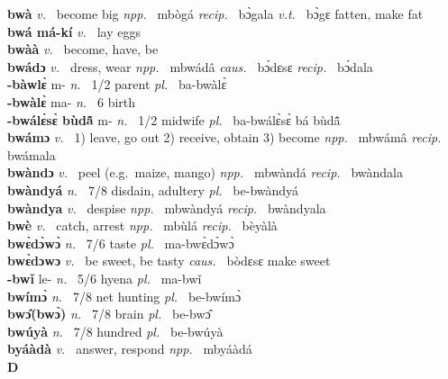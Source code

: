 {\bfseries bwà}  {\itshape v.~} become big   {\itshape npp.~} mbògá {\itshape recip.~} bɔ̀gala {\itshape v.t.~} bɔ̀gɛ fatten, make fat \\ 
{\bfseries bwá má-kí}  {\itshape v.~} lay eggs    \\ 
{\bfseries bwàà}  {\itshape v.~} become, have, be    \\ 
{\bfseries bwádɔ}  {\itshape v.~} dress, wear   {\itshape npp.~} mbwádâ {\itshape caus.~} bɔ́dɛsɛ {\itshape recip.~} bɔ́dala  \\ 
{\bfseries -bàwlɛ̀} m- {\itshape n.~} 1/2 parent {\itshape pl.~} ba-bwàlɛ̀   \\ 
{\bfseries -bwàlɛ̀} ma- {\itshape n.~} 6 birth    \\ 
{\bfseries -bwálɛ̀sɛ̀ bùdã̂} m- {\itshape n.~} 1/2 midwife {\itshape pl.~} ba-bwálɛ̀sɛ̀ bá bùdã̂    \\ 
{\bfseries bwámɔ}  {\itshape v.~} 1) leave, go out 2) receive, obtain 3) become   {\itshape npp.~} mbwámâ {\itshape recip.~} bwámala  \\ 
{\bfseries bwàndɔ}  {\itshape v.~} peel (e.g.\ maize, mango)   {\itshape npp.~} mbwàndá {\itshape recip.~} bwàndala  \\ 
{\bfseries bwàndyá}  {\itshape n.~} 7/8 disdain, adultery {\itshape pl.~} be-bwàndyá    \\ 
{\bfseries bwàndya}  {\itshape v.~} despise   {\itshape npp.~} mbwàndyá {\itshape recip.~} bwàndyala  \\ 
{\bfseries bwè}  {\itshape v.~} catch, arrest   {\itshape npp.~} mbùlá {\itshape recip.~} bèyàlà  \\ 
{\bfseries bwɛ̀dɔ̀wɔ̀}  {\itshape n.~} 7/6 taste {\itshape pl.~} ma-bwɛ̀dɔ̀wɔ̀    \\ 
{\bfseries bwɛ̀dɔwɔ}  {\itshape v.~} be sweet, be tasty   {\itshape caus.~} bòdɛsɛ make sweet  \\ 
{\bfseries -bwǐ} le- {\itshape n.~} 5/6 hyena {\itshape pl.~} ma-bwǐ    \\ 
{\bfseries bwímɔ̀}  {\itshape n.~} 7/8 net hunting {\itshape pl.~} be-bwímɔ̀    \\ 
{\bfseries bwɔ̂(bwɔ̀)}  {\itshape n.~} 7/8 brain {\itshape pl.~} be-bwɔ̂    \\ 
{\bfseries bwúyà}  {\itshape n.~} 7/8 hundred {\itshape pl.~} be-bwúyà    \\ 
{\bfseries byáàdà}  {\itshape v.~} answer, respond   {\itshape npp.~} mbyáàdá  \\ 

\newpage
\medskip
\noindent \large {\bfseries D}\normalsize\\
\medskip

